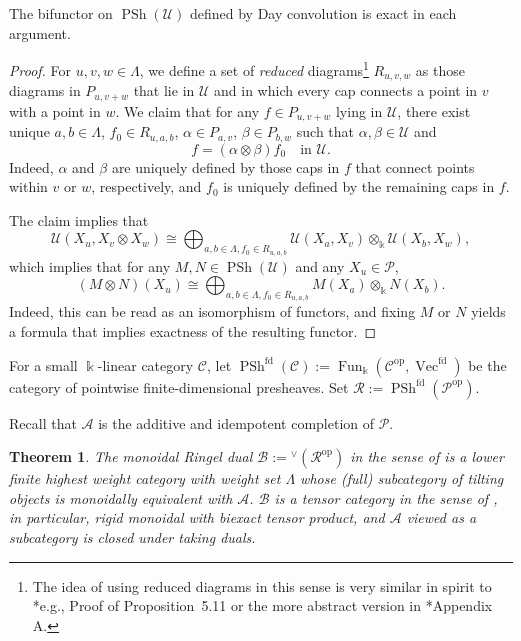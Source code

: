 \documentclass[11pt,oneside]{amsart}
\newtheorem{theorem}{Theorem}[section]
\theoremstyle{definition}
\theoremstyle{remark}
\newcommand\kk{\Bbbk}
\newcommand\cA{\mathcal A}
\newcommand\cB{\mathcal B}
\newcommand\cC{\mathcal C}
\newcommand\cP{\mathcal P}
\newcommand\cR{\mathcal R}
\newcommand\cU{\mathcal U}
\newcommand\Fun{\operatorname{Fun}}
\newcommand\PSh{\operatorname{PSh}}
\newcommand\Vect{\operatorname{Vec}}
\renewcommand\o\otimes
\renewcommand\:\colon
\newcommand\op{^{\mathrm{op}}}
\newcommand\fd{^{\mathrm{fd}}}
\begin{document}
\begin{lemma} \label{lem-2} The bifunctor on $\PSh(\cU)$ defined by Day convolution is exact in each argument.
\end{lemma}

\begin{proof} For $u,v,w\in\Lambda$, we define a set of \emph{reduced} diagrams\footnote{The idea of using reduced diagrams in this sense is very similar in spirit to \cite{SS}*{e.g., Proof of Proposition~5.11} or the more abstract version in \cite{FG}*{Appendix A}.} $R_{u,v,w}$ as those diagrams in $P_{u,v+w}$ that lie in $\cU$ and in which every cap connects a point in $v$ with a point in $w$. We claim that for any $f\in P_{u,v+w}$ lying in $\cU$, there exist unique $a,b\in\Lambda$, $f_0\in R_{u,a,b}$, $\alpha\in P_{a,v}$, $\beta\in P_{b,w}$ such that $\alpha,\beta\in\cU$ and
$$
f = (\alpha\o\beta) f_0
\quad\text{in }\cU .
$$
Indeed, $\alpha$ and $\beta$ are uniquely defined by those caps in $f$ that connect points within $v$ or $w$, respectively, and $f_0$ is uniquely defined by the remaining caps in $f$.

The claim implies that
$$
\cU(X_u, X_v\o X_w) \cong
\bigoplus_{a,b\in\Lambda,f_0\in R_{u,a,b}} \cU(X_a,X_v)\o_\kk \cU(X_b,X_w) ,
$$
which implies that for any $M,N\in\PSh(\cU)$ and any $X_u\in\cP$,
$$
(M\o N)(X_u) \cong \bigoplus_{a,b\in\Lambda,f_0\in R_{u,a,b}} M(X_a)\o_\kk N(X_b) . 
$$
Indeed, this can be read as an isomorphism of functors, and fixing $M$ or $N$ yields a formula that implies exactness of the resulting functor.
\end{proof}

For a small $\kk$-linear category $\cC$, let $\PSh\fd(\cC):=\Fun_\kk(\cC\op,\Vect\fd)$ be the category of pointwise finite-dimensional presheaves. Set $\cR:=\PSh\fd(\cP\op)$.

Recall that $\cA$ is the additive and idempotent completion of $\cP$.

\begin{theorem} \label{thm-1} The monoidal Ringel dual $\cB:={}^\vee(\cR\op)$ in the sense of \cite{FG} is a lower finite highest weight category with weight set $\Lambda$ whose (full) subcategory of tilting objects is monoidally equivalent with $\cA$. $\cB$ is a tensor category in the sense of \cite{CEOP}, in particular, rigid monoidal with biexact tensor product, and $\cA$ viewed as a subcategory is closed under taking duals.
\end{theorem}
\end{document}
